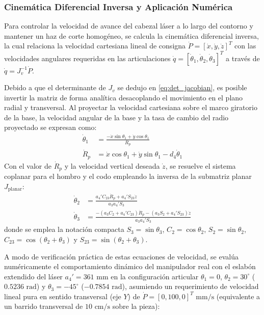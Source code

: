 \documentclass[conference,a4paper]{IEEEtran}
\begin{document}
\subsubsection{Cinemática Diferencial Inversa y Aplicación Numérica}
Para controlar la velocidad de avance del cabezal láser a lo largo del contorno y mantener un haz de corte homogéneo, se calcula la cinemática diferencial inversa, la cual relaciona la velocidad cartesiana lineal de consigna $\dot{P} = [\dot{x}, \dot{y}, \dot{z}]^T$ con las velocidades angulares requeridas en las articulaciones $\dot{q} = [\dot{\theta}_1, \dot{\theta}_2, \dot{\theta}_3]^T$ a través de $\dot{q} = J_v^{-1} \dot{P}$.

Debido a que el determinante de $J_v$ se dedujo en \eqref{eq:det_jacobian}, es posible invertir la matriz de forma analítica desacoplando el movimiento en el plano radial y transversal. Al proyectar la velocidad cartesiana sobre el marco giratorio de la base, la velocidad angular de la base y la tasa de cambio del radio proyectado se expresan como:
\begin{align}
\dot{\theta}_1 &= \frac{- \dot{x} \sin\theta_1 + \dot{y} \cos\theta_1}{R_p} \label{eq:inv_j1} \\
\dot{R}_p &= \dot{x} \cos\theta_1 + \dot{y} \sin\theta_1 - d_4 \dot{\theta}_1 \label{eq:inv_rp}
\end{align}
Con el valor de $\dot{R}_p$ y la velocidad vertical deseada $\dot{z}$, se resuelve el sistema coplanar para el hombro y el codo empleando la inversa de la submatriz planar $J_{\text{planar}}$:
\begin{align}
\dot{\theta}_2 &= \frac{a_4' C_{23} \dot{R}_p + a_4' S_{23} \dot{z}}{a_3 a_4' S_3} \label{eq:inv_j2} \\
\dot{\theta}_3 &= \frac{-(a_3 C_2 + a_4' C_{23}) \dot{R}_p - (a_3 S_2 + a_4' S_{23}) \dot{z}}{a_3 a_4' S_3} \label{eq:inv_j3}
\end{align}
donde se emplea la notación compacta $S_3 = \sin\theta_3$, $C_2 = \cos\theta_2$, $S_2 = \sin\theta_2$, $C_{23} = \cos(\theta_2+\theta_3)$ y $S_{23} = \sin(\theta_2+\theta_3)$.

A modo de verificación práctica de estas ecuaciones de velocidad, se evalúa numéricamente el comportamiento dinámico del manipulador real con el eslabón extendido del láser $a_4' = 361\text{ mm}$ en la configuración articular $\theta_1 = 0$, $\theta_2 = 30^\circ$ ($0.5236\text{ rad}$) y $\theta_3 = -45^\circ$ ($-0.7854\text{ rad}$), asumiendo un requerimiento de velocidad lineal pura en sentido transversal (eje $Y$) de $\dot{P} = [0, 100, 0]^T\text{ mm/s}$ (equivalente a un barrido transversal de $10\text{ cm/s}$ sobre la pieza):
\end{document}
